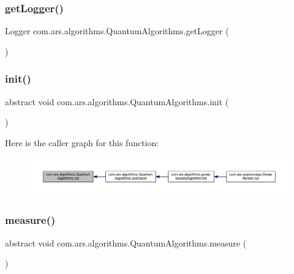 \subsubsection{\texorpdfstring{get\+Logger()}{getLogger()}}
{\footnotesize\ttfamily Logger com.\+ars.\+algorithms.\+Quantum\+Algorithms.\+get\+Logger (\begin{DoxyParamCaption}{ }\end{DoxyParamCaption})}

\hypertarget{classcom_1_1ars_1_1algorithms_1_1_quantum_algorithms_ae2f995342974067844f8cf671e156269}{}\label{classcom_1_1ars_1_1algorithms_1_1_quantum_algorithms_ae2f995342974067844f8cf671e156269} 
\subsubsection{\texorpdfstring{init()}{init()}}
{\footnotesize\ttfamily abstract void com.\+ars.\+algorithms.\+Quantum\+Algorithms.\+init (\begin{DoxyParamCaption}{ }\end{DoxyParamCaption})\hspace{0.3cm}{\ttfamily [abstract]}}

Here is the caller graph for this function\+:\nopagebreak
\begin{figure}[H]
\begin{center}
\leavevmode
\includegraphics[width=350pt]{classcom_1_1ars_1_1algorithms_1_1_quantum_algorithms_ae2f995342974067844f8cf671e156269_icgraph}
\end{center}
\end{figure}
\hypertarget{classcom_1_1ars_1_1algorithms_1_1_quantum_algorithms_afcae7e993d2d70942a7ffd6485c44b1e}{}\label{classcom_1_1ars_1_1algorithms_1_1_quantum_algorithms_afcae7e993d2d70942a7ffd6485c44b1e} 
\subsubsection{\texorpdfstring{measure()}{measure()}}
{\footnotesize\ttfamily abstract void com.\+ars.\+algorithms.\+Quantum\+Algorithms.\+measure (\begin{DoxyParamCaption}{ }\end{DoxyParamCaption})\hspace{0.3cm}{\ttfamily [abstract]}}

